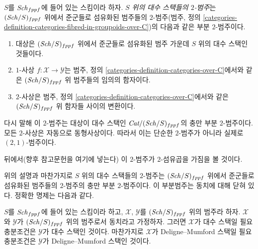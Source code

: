 \begin{definition}
\label{definition-morphism-algebraic-stacks}
$S$를 $\mathit{Sch}_{fppf}$에 들어 있는 스킴이라 하자.
{\it $S$ 위의 대수 스택들의 $2$-범주}는 $(\mathit{Sch}/S)_{fppf}$ 위에서
준군들로 섬유화된 범주들의 $2$-범주(범주, 정의
\ref{categories-definition-categories-fibred-in-groupoids-over-C})의
다음과 같은 부분 $2$-범주이다.
\begin{enumerate}
\item 대상은 $(\mathit{Sch}/S)_{fppf}$ 위에서 준군들로 섬유화된 범주 가운데
$S$ 위의 대수 스택인 것들이다.
\item $1$-사상 $f : \mathcal{X} \to \mathcal{Y}$는 범주, 정의
\ref{categories-definition-categories-over-C}에서와 같은
$(\mathit{Sch}/S)_{fppf}$ 위 범주들의 임의의 함자이다.
\item $2$-사상은 범주, 정의 \ref{categories-definition-categories-over-C}에서와
같은 $(\mathit{Sch}/S)_{fppf}$ 위 함자들 사이의 변환이다.
\end{enumerate}
\end{definition}

\noindent
다시 말해 이 $2$-범주는 대상이 대수 스택인
$\textit{Cat}/(\mathit{Sch}/S)_{fppf}$의 충만 부분 $2$-범주이다. 모든
$2$-사상은 자동으로 동형사상이다. 따라서 이는 단순한 $2$-범주가 아니라
실제로 $(2, 1)$-범주이다.

\medskip\noindent
뒤에서(향후 참고문헌을 여기에 넣는다) 이 $2$-범주가 $2$-섬유곱을
가짐을 볼 것이다.

\medskip\noindent
위의 설명과 마찬가지로 $S$ 위의 대수 스택들의 $2$-범주는
$(\mathit{Sch}/S)_{fppf}$ 위에서 준군들로 섬유화된 범주들의 $2$-범주의 충만
부분 $2$-범주이다. 이 부분범주는 동치에 대해 닫혀 있다. 정확한 명제는
다음과 같다.

\begin{lemma}
\label{lemma-equivalent}
$S$를 $\mathit{Sch}_{fppf}$에 들어 있는 스킴이라 하고, $\mathcal{X}$,
$\mathcal{Y}$를 $(\mathit{Sch}/S)_{fppf}$ 위의 범주라 하자. $\mathcal{X}$와
$\mathcal{Y}$가 $(\mathit{Sch}/S)_{fppf}$ 위의 범주로서 동치라고 가정하자.
그러면 $\mathcal{X}$가 대수 스택일 필요충분조건은 $\mathcal{Y}$가
대수 스택인 것이다. 마찬가지로 $\mathcal{X}$가 Deligne--Mumford 스택일
필요충분조건은 $\mathcal{Y}$가 Deligne--Mumford 스택인 것이다.
\end{lemma}

